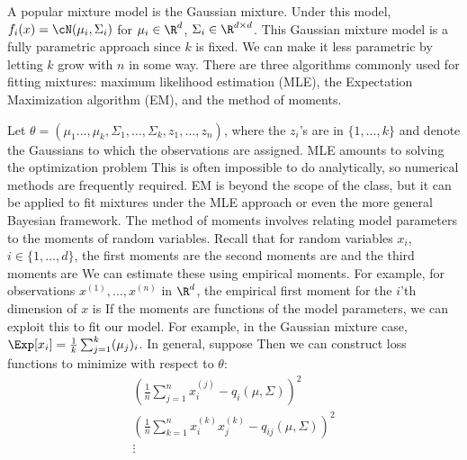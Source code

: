 
A popular mixture model is the Gaussian mixture. Under this model, $f_i(x) = \cN(\mu_i, \Sigma_i)$ for $\mu_i \in \R^d$, $\Sigma_i \in \R^{d \times d}$.  
This Gaussian mixture model is a fully parametric approach since $k$ is fixed. We can make it less parametric by letting $k$ grow with $n$ in some way. There are three algorithms commonly used for fitting mixtures: maximum likelihood estimation (MLE), the Expectation Maximization algorithm (EM), and the method of moments. 

Let $\theta = (\mu_1 \dots, \mu_k, \Sigma_1, \dots, \Sigma_k, z_1, \dots, z_n)$, where the $z_i$'s are in $\{1, \dots, k\}$ and denote the Gaussians to which the observations are assigned. MLE amounts to solving the optimization problem 
This is often impossible to do analytically, so numerical methods are frequently required. EM is beyond the scope of the class, but it can be applied to fit mixtures under the MLE approach or even the more general Bayesian framework. The method of moments involves relating model parameters to the moments of random variables. Recall that for random variables $x_i$, $i \in \{1, \dots, d\}$, the first moments are 
the second moments are
and the third moments are 
We can estimate these using empirical moments. For example, for observations $x^{(1)}, \dots, x^{(n)}$ in $\R^d$, the empirical first moment for the $i$'th dimension of $x$ is 
If the moments are functions of the model parameters, we can exploit this to fit our model. For example, in the Gaussian mixture case, $\Exp[x_i] = \frac{1}{k}\sum_{j=1}^k (\mu_j)_i$. In general, suppose 
Then we can construct loss functions to minimize with respect to $\theta$:
\begin{gather}
\left( \frac{1}{n}\sum_{j=1}^n x_i^{(j)} - q_i(\mu, \Sigma)\right)^2\\
\left( \frac{1}{n}\sum_{k=1}^n x_i^{(k)}x_j^{(k)} - q_{ij}(\mu, \Sigma)\right)^2\\
\vdots \nonumber
\end{gather}

